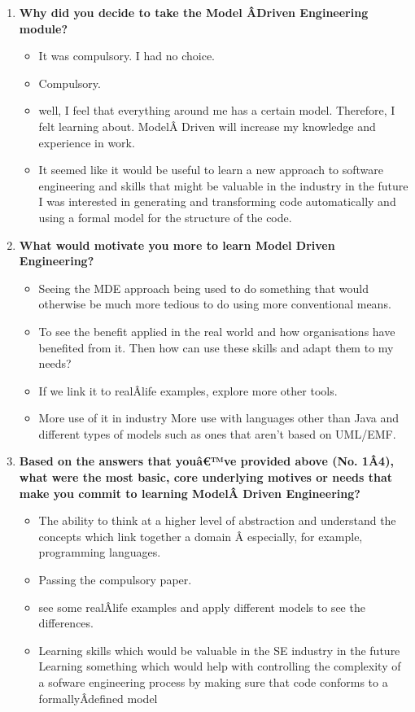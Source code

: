 \documentclass[12pt, a4paper]{report} \usepackage[titletoc]{appendix}
\begin{document}
\begin{appendices}
\begin{enumerate}
\item \textbf{ Why did you decide to take the Model Â­Driven Engineering module?}
\begin{itemize}
\item It was compulsory. I had no choice.
\item Compulsory.
\item well, I feel that everything around me has a certain model. Therefore, I felt learning about. ModelÂ­ Driven will increase my knowledge and experience in work. 
\item It seemed like it would be useful to learn a new approach to software engineering and skills that might be valuable in the industry in the future I was interested in generating and transforming code automatically and using a formal model for the structure of the code.
\end{itemize}


\item \textbf{ What would motivate you more to learn Model Driven Engineering?}
\begin{itemize}
\item Seeing the MDE approach being used to do something that would otherwise be much more tedious to do using more conventional means.
\item To see the benefit applied in the real world and how organisations have benefited from it. Then how can use these skills and adapt them to my needs?
\item If we link it to realÂ­life examples, explore more other tools.
\item More use of it in industry More use with languages other than Java and different types of models such as ones that aren't based on UML/EMF.
\end{itemize}

\item \textbf{ Based on the answers that youâ€™ve provided above (No. 1Â­4), what were the most basic, core underlying motives or needs that make you commit to learning ModelÂ­
Driven Engineering?}

\begin{itemize}
\item The ability to think at a higher level of abstraction and understand the concepts which link together a domain Â­ especially, for example, programming languages. 
\item Passing the compulsory paper.
\item see some realÂ­life examples and apply different models to see the differences. 
\item Learning skills which would be valuable in the SE industry in the future Learning something which would help with controlling the complexity of a sofware engineering process by making sure that code
conforms to a formallyÂ­defined model
\end{itemize}



\end{enumerate}
\end{appendices}
\end{document}
